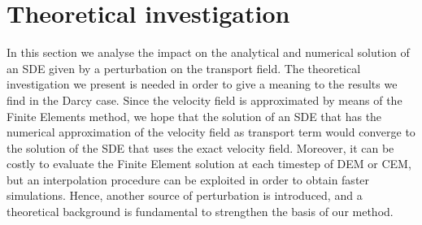\section{Theoretical investigation}
In this section we analyse the impact on the analytical and numerical solution of an SDE given by a perturbation on the transport field. The theoretical investigation we present is needed in order to give a meaning to the results we find in the Darcy case. Since the velocity field is approximated by means of the Finite Elements method, we hope that the solution of an SDE that has the numerical approximation of the velocity field as transport term would converge to the solution of the SDE that uses the exact velocity field. Moreover, it can be costly to evaluate the Finite Element solution at each timestep of DEM or CEM, but an interpolation procedure can be exploited in order to obtain faster simulations. Hence, another source of perturbation is introduced, and a theoretical background is fundamental to strengthen the basis of our method.

